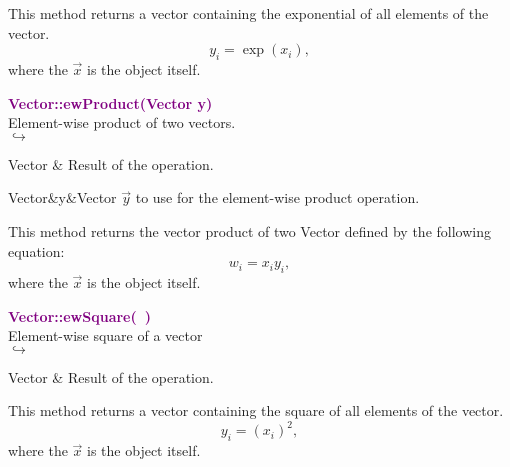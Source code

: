 This method returns a vector containing the exponential of all elements of the vector.
\begin{equation*}
y_i = \exp(x_i),
\end{equation*}
where the $\overrightarrow{x}$ is the object itself.

\textcolor{purple}{\textbf{Vector::ewProduct(Vector y)}}\label{Vector::ewProduct(Vector y)}\\
Element-wise product of two vectors.\\ \hspace*{5mm}$\hookrightarrow$
\vspace*{-2em}\begin{tcolorbox}[grow to left by=-1cm, width=\textwidth-1cm,myArgs,tabularx={l|R}]
Vector & Result of the operation.
\end{tcolorbox}

\begin{tcolorbox}[width=\textwidth,myArgs,tabularx={ll|R}]
Vector&y&Vector $\overrightarrow{y}$ to use for the element-wise product operation.
\end{tcolorbox}

This method returns the vector product of two Vector defined by the following equation:
\begin{equation*}
w_i = x_i y_i,
\end{equation*}
where the $\overrightarrow{x}$ is the object itself.

\textcolor{purple}{\textbf{Vector::ewSquare(~)}}\label{Vector::ewSquare()}\\
Element-wise square of a vector\\ \hspace*{5mm}$\hookrightarrow$
\vspace*{-2em}\begin{tcolorbox}[grow to left by=-1cm, width=\textwidth-1cm,myArgs,tabularx={l|R}]
Vector & Result of the operation.
\end{tcolorbox}

This method returns a vector containing the square of all elements of the vector.
\begin{equation*}
y_i = (x_i)^2,
\end{equation*}
where the $\overrightarrow{x}$ is the object itself.

